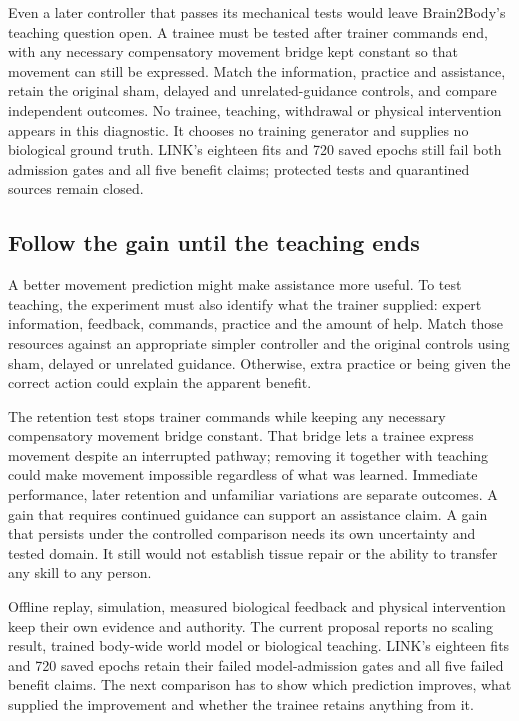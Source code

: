 Even a later controller that passes its mechanical tests would leave Brain2Body's teaching question open. A trainee must be tested after trainer commands end, with any necessary compensatory movement bridge kept constant so that movement can still be expressed. Match the information, practice and assistance, retain the original sham, delayed and unrelated-guidance controls, and compare independent outcomes. No trainee, teaching, withdrawal or physical intervention appears in this diagnostic. It chooses no training generator and supplies no biological ground truth. LINK's eighteen fits and 720 saved epochs still fail both admission gates and all five benefit claims; protected tests and quarantined sources remain closed.

\subsection{Follow the gain until the teaching ends}

A better movement prediction might make assistance more useful. To test teaching, the experiment must also identify what the trainer supplied: expert information, feedback, commands, practice and the amount of help. Match those resources against an appropriate simpler controller and the original controls using sham, delayed or unrelated guidance. Otherwise, extra practice or being given the correct action could explain the apparent benefit.

The retention test stops trainer commands while keeping any necessary compensatory movement bridge constant. That bridge lets a trainee express movement despite an interrupted pathway; removing it together with teaching could make movement impossible regardless of what was learned. Immediate performance, later retention and unfamiliar variations are separate outcomes. A gain that requires continued guidance can support an assistance claim. A gain that persists under the controlled comparison needs its own uncertainty and tested domain. It still would not establish tissue repair or the ability to transfer any skill to any person.

Offline replay, simulation, measured biological feedback and physical intervention keep their own evidence and authority. The current proposal reports no scaling result, trained body-wide world model or biological teaching. LINK's eighteen fits and 720 saved epochs retain their failed model-admission gates and all five failed benefit claims. The next comparison has to show which prediction improves, what supplied the improvement and whether the trainee retains anything from it.
